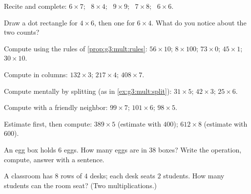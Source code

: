 \begin{exercise}[$\star$]\label{exo:g3:mult:2}
Recite and complete: $6 \times 7$; \ $8 \times 4$; \ $9 \times 9$;
\ $7 \times 8$; \ $6 \times 6$.
\end{exercise}

\begin{exercise}[$\star$]\label{exo:g3:mult:3}
Draw a dot rectangle for $4 \times 6$, then one for $6 \times 4$.
What do you notice about the two counts?
\end{exercise}

\begin{exercise}[$\star$]\label{exo:g3:mult:4}
Compute using the rules of \cref{prop:g3:mult:rules}:
$56 \times 10$; \quad $8 \times 100$; \quad $73 \times 0$; \quad
$45 \times 1$; \quad $30 \times 10$.
\end{exercise}

\begin{exercise}[$\star$]\label{exo:g3:mult:5}
Compute in columns: $132 \times 3$; \quad $217 \times 4$; \quad
$408 \times 7$.
\end{exercise}

\begin{exercise}[$\star$]\label{exo:g3:mult:6}
Compute mentally by splitting (as in \cref{ex:g3:mult:split}):
$31 \times 5$; \quad $42 \times 3$; \quad $25 \times 6$.
\end{exercise}

\begin{exercise}[$\star$]\label{exo:g3:mult:7}
Compute with a friendly neighbor: $99 \times 7$; \quad
$101 \times 6$; \quad $98 \times 5$.
\end{exercise}

\begin{exercise}[$\star$]\label{exo:g3:mult:8}
Estimate first, then compute: $389 \times 5$ (estimate with $400$);
$612 \times 8$ (estimate with $600$).
\end{exercise}

\begin{exercise}[$\star$]\label{exo:g3:mult:9}
An egg box holds $6$ eggs. How many eggs are in $38$ boxes? Write
the operation, compute, answer with a sentence.
\end{exercise}

\begin{exercise}[$\star\star$]\label{exo:g3:mult:10}
A classroom has $8$ rows of $4$ desks; each desk seats $2$ students.
How many students can the room seat? (Two multiplications.)
\end{exercise}


